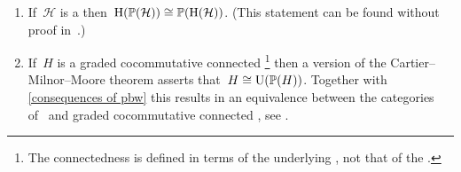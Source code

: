 \documentclass[a4paper,10pt,headings=standardclasses]{scrartcl}
\begin{document}
\begin{remark}
  \leavevmode
  \begin{enumerate}
    \item
      If~$\mathcal{H}$ is a {\dgh} then~$\operatorname{H}(\mathbb{P}(\mathcal{H})) \cong \mathbb{P}(\operatorname{H}(\mathcal{H}))$.
      (This statement can be found without proof in~\cite[Theorem~A.9]{loday}.)
    \item
      If~$H$ is a graded cocommutative connected%
      \footnote{The connectedness is defined in terms of the underlying {\dgc}, not that of the {\dga}.}
      {\dgh} then a version of the Cartier--Milnor--Moore theorem asserts that~$H \cong \operatorname{U}(\mathbb{P}(H))$.
      Together with \cref{consequences of pbw} this results in an equivalence between the categories of~{\dgls} and graded cocommutative connected {\dghs}, see \cite[Appendix~B,Theorem~4.5]{quillen}.
  \end{enumerate}
\end{remark}





\appendix






\end{document}
